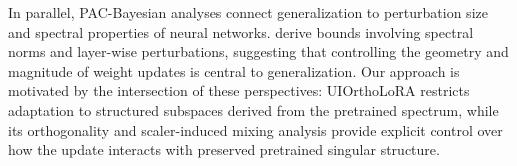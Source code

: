 In parallel, PAC-Bayesian analyses connect generalization to perturbation size and spectral properties of neural networks. \citet{neyshabur2017pac, neyshabur2018pacbayesian} derive bounds involving spectral norms and layer-wise perturbations, suggesting that controlling the geometry and magnitude of weight updates is central to generalization. Our approach is motivated by the intersection of these perspectives: UIOrthoLoRA restricts adaptation to structured subspaces derived from the pretrained spectrum, while its orthogonality and scaler-induced mixing analysis provide explicit control over how the update interacts with preserved pretrained singular structure.



